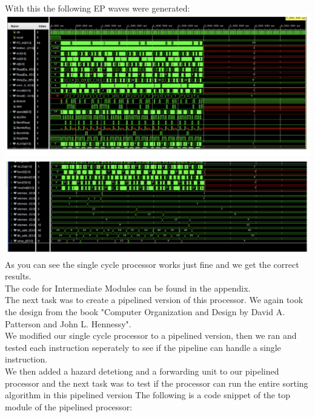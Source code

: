 \documentclass[a4paper, 12pt]{report}
\begin{document}
\\With this the following EP waves were generated:
\\\includegraphics[scale = 0.5]{sc ep 1.png}
\\\includegraphics[scale = 0.5]{sc ep 2.png}
\\As you can see the single cycle processor works just fine and we get the correct results.
\\The code for Intermediate Modules can be found in the appendix.
\vspace{2cm}
\\The next task was to create a pipelined version of this processor. We again took the design from the book "Computer Organization and Design by David A. Patterson and John L. Hennessy".
\\We modified our single cycle processor to a pipelined version, then we ran and tested each instruction seperately to see if the pipeline can handle a single instruction.
\\We then added a hazard detetiong and  a forwarding unit to our pipelined processor and the next task was to test if the processor can run the entire sorting algorithm in this pipelined version
The following is a code snippet of the top module of the pipelined processor:
\end{document}
